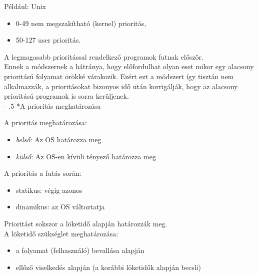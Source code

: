 \documentclass[tikz,12pt,margin=0px]{article}
\makeatletter
\renewcommand\paragraph{%
	\@startsection{paragraph}{4}{0mm}%
	{-\baselineskip}%
	{.5\baselineskip}%
	{\normalfont\normalsize\bfseries}}
\makeatother
\begin{document}
    \noindent Például: Unix
    \begin{itemize}[topsep=8pt,itemsep=4pt,partopsep=4pt, parsep=4pt]
        \item 0-49 nem megszakítható (kernel) prioritás,
        \item 50-127 user prioritás.
    \end{itemize}
    A legmagasabb prioritással rendelkező programok futnak először. \\

    \noindent Ennek a módszernek a hátránya, hogy előfordulhat olyan eset mikor egy alacsony prioritású folyamat örökké várakozik. Ezért ezt a módszert így tisztán nem alkalmazzák, a prioritásokat bizonyos idő után korrigálják, hogy az alacsony prioritású programok is sorra kerüljenek.\\

    \paragraph*{A prioritás meghatározása}

    \noindent A prioritás meghatározása:
    \begin{itemize}[topsep=8pt,itemsep=4pt,partopsep=4pt, parsep=4pt]
      \item \emph{belső}: Az OS határozza meg
      \item \emph{külső}: Az OS-en kívüli tényező határozza meg
    \end{itemize}

    \noindent A prioritás a futás során:
    \begin{itemize}[topsep=8pt,itemsep=4pt,partopsep=4pt, parsep=4pt]
        \item statikus: végig azonos
        \item dinamikus: az OS változtatja
    \end{itemize}

    \noindent Prioritást sokszor a löketidő alapján határozzák meg.\\

    \noindent A löketidő szükséglet meghatározása:
    \begin{itemize}[topsep=8pt,itemsep=4pt,partopsep=4pt, parsep=4pt]
      \item a folyamat (felhasználó) bevallása alapján
      \item ellőző viselkedés alapján (a korábbi löketidők alapján becsli)
    \end{itemize}
\end{document}
